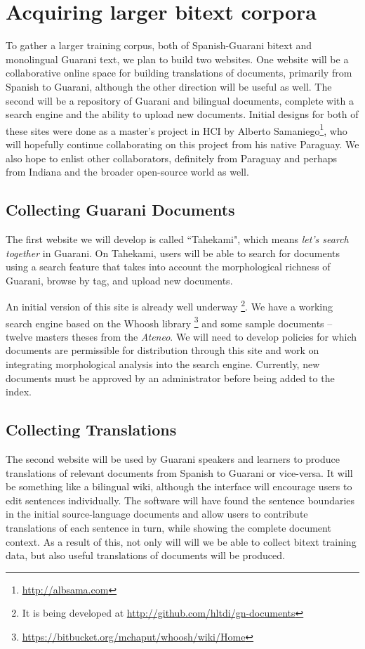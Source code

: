\section{Acquiring larger bitext corpora}
To gather a larger training corpus, both of Spanish-Guarani bitext and
monolingual Guarani text, we plan to build two websites. One website will be a
collaborative online space for building translations of documents, primarily
from Spanish to Guarani, although the other direction will be useful as well.
The second will be a repository of Guarani and bilingual documents,
complete with a search engine and the ability to upload new documents.
Initial designs for both of these sites were done as a master's project in HCI
by Alberto Samaniego\footnote{\url{http://albsama.com}}, who will hopefully
continue collaborating on this project from his native Paraguay. We also hope
to enlist other collaborators, definitely from Paraguay and perhaps from
Indiana and the broader open-source world as well.

\subsection{Collecting Guarani Documents}
The first website we will develop is called ``Tahekami", which means
\emph{let's search together} in Guarani.
On Tahekami, users will be able to search for documents
using a search feature that takes into account the morphological richness of
Guarani, browse by tag, and upload new documents.

An initial version of this site is already well underway \footnote{It is being
developed at \url{http://github.com/hltdi/gn-documents}}. We have a working
search engine based on the Whoosh library
\footnote{\url{https://bitbucket.org/mchaput/whoosh/wiki/Home}} and some sample
documents -- twelve masters theses from the \emph{Ateneo}.  We will need to
develop policies for which documents are permissible for distribution through
this site and work on integrating morphological analysis into the search
engine. Currently, new documents must be approved by an administrator before
being added to the index.

\subsection{Collecting Translations}
The second website will be used by Guarani speakers and learners to produce
translations of relevant documents from Spanish to Guarani or vice-versa.
It will be something like a bilingual wiki, although the interface will
encourage users to edit sentences individually. The software will have found
the sentence boundaries in the initial source-language documents and allow
users to contribute translations of each sentence in turn, while showing the
complete document context.
As a result of this, not only will will we be able to collect bitext training
data, but also useful translations of documents will be produced.


